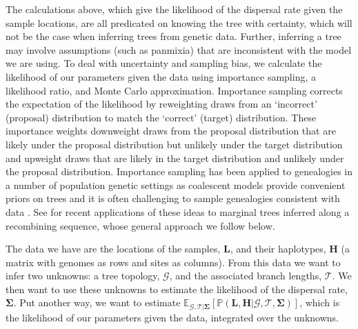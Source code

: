\documentclass[12pt]{article}
\begin{document}
The calculations above, which give the likelihood of the dispersal rate given the sample locations, are all predicated on knowing the tree with certainty, which will not be the case when inferring trees from genetic data.
Further, inferring a tree may involve assumptions (such as panmixia) that are inconsistent with the model we are using.
To deal with uncertainty and sampling bias, we calculate the likelihood of our parameters given the data using importance sampling, a likelihood ratio, and Monte Carlo approximation.
Importance sampling corrects the expectation of the likelihood by reweighting draws from an `incorrect' (proposal) distribution to match the `correct' (target) distribution. 
These importance weights downweight draws from the proposal distribution that are likely under the proposal distribution but unlikely under the target distribution and upweight draws that are likely in the target distribution and unlikely under the proposal distribution. 
Importance sampling has been applied to genealogies in a number of population genetic settings as coalescent models provide convenient priors on trees and it is often challenging to sample genealogies consistent with data \citep{griffiths1997computational,stephens2000inference,meligkotsidou2007postprocessing}. 
See \cite{stern2019approximate,stern2020disentangling} for recent applications of these ideas to marginal trees inferred along a recombining sequence, whose general approach we follow below.  

The data we have are the locations of the samples, $\mathbf{L}$, and their haplotypes, $\mathbf{H}$ (a matrix with genomes as rows and sites as columns).
From this data we want to infer two unknowns: a tree topology, $\mathcal{G}$, and the associated branch lengths, $\mathcal{T}$.
We then want to use these unknowns to estimate the likelihood of the dispersal rate, $\mathbf{\Sigma}$.
Put another way, we want to estimate $\mathbb{E}_{\mathcal{G},\mathcal{T} | \mathbf{\Sigma}} \left[ \mathbb{P}(\mathbf{L},\mathbf{H} | \mathcal{G},\mathcal{T},\mathbf{\Sigma}) \right]$, which is the likelihood of our parameters given the data, integrated over the unknowns. 
\end{document}
